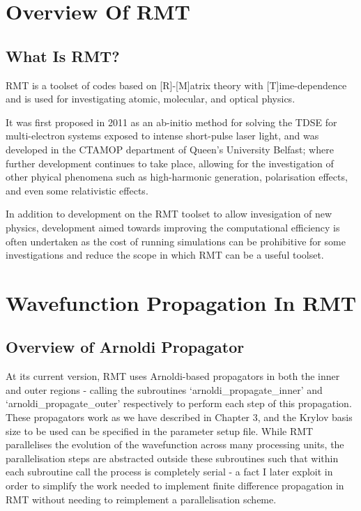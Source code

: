 \section{Overview Of RMT}
\subsection{What Is RMT?}
RMT is a toolset of codes based on [R]-[M]atrix theory with [T]ime-dependence and is used for investigating atomic, molecular, and optical physics. 

It was first proposed\cite{LMoore} in 2011 as an ab-initio method for solving the TDSE for multi-electron systems exposed to intense short-pulse laser light, and was developed in the CTAMOP department of Queen's University Belfast; where further development continues to take place, allowing for the investigation of other phyical phenomena such as high-harmonic generation, polarisation effects, and even some relativistic effects. 

In addition to development on the RMT toolset to allow invesigation of new physics, development aimed towards improving the computational efficiency is often undertaken as the cost of running simulations can be prohibitive for some investigations and reduce the scope in which RMT can be a useful toolset.

\section{Wavefunction Propagation In RMT}
\subsection{Overview of Arnoldi Propagator}
At its current version, RMT uses Arnoldi-based propagators in both the inner and outer regions - calling the subroutines `arnoldi\_propagate\_inner' and `arnoldi\_propagate\_outer' respectively to perform each step of this propagation. These propagators work as we have described in Chapter 3, and the Krylov basis size to be used can be specified in the parameter setup file. While RMT parallelises the evolution of the wavefunction across many processing units, the parallelisation steps are abstracted outside these subroutines such that within each subroutine call the process is completely serial - a fact I later exploit in order to simplify the work needed to implement finite difference propagation in RMT without needing to reimplement a parallelisation scheme.

